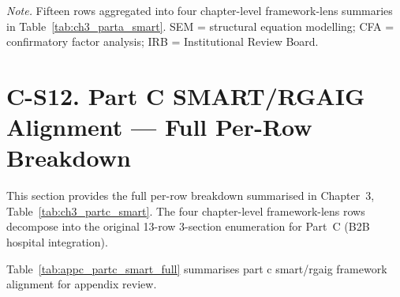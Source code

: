 \vspace{0.4em}
\noindent\textit{Note.} Fifteen rows aggregated into four chapter-level framework-lens summaries in Table~\ref{tab:ch3_parta_smart}. SEM = structural equation modelling; CFA = confirmatory factor analysis; IRB = Institutional Review Board.

\section*{C-S12. Part C SMART/RGAIG Alignment --- Full Per-Row Breakdown}
\label{sec:appc_partc_smart_full}

\noindent This section provides the full per-row breakdown summarised in Chapter~3, Table~\ref{tab:ch3_partc_smart}. The four chapter-level framework-lens rows decompose into the original 13-row 3-section enumeration for Part~C (B2B hospital integration).

\noindent Table~\ref{tab:appc_partc_smart_full} summarises part c smart/rgaig framework alignment for appendix review.

